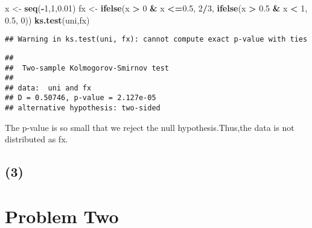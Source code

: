 \documentclass[]{article}
\newenvironment{Shaded}{\begin{snugshade}}{\end{snugshade}}
\newcommand{\KeywordTok}[1]{\textcolor[rgb]{0.13,0.29,0.53}{\textbf{#1}}}
\newcommand{\DecValTok}[1]{\textcolor[rgb]{0.00,0.00,0.81}{#1}}
\newcommand{\FloatTok}[1]{\textcolor[rgb]{0.00,0.00,0.81}{#1}}
\newcommand{\StringTok}[1]{\textcolor[rgb]{0.31,0.60,0.02}{#1}}
\newcommand{\OperatorTok}[1]{\textcolor[rgb]{0.81,0.36,0.00}{\textbf{#1}}}
\newcommand{\NormalTok}[1]{#1}
\begin{document}
\begin{Shaded}
\begin{Highlighting}[]
\NormalTok{x <-}\StringTok{ }\KeywordTok{seq}\NormalTok{(}\OperatorTok{-}\DecValTok{1}\NormalTok{,}\DecValTok{1}\NormalTok{,}\FloatTok{0.01}\NormalTok{)}
\NormalTok{fx <-}\StringTok{ }\KeywordTok{ifelse}\NormalTok{(x }\OperatorTok{>}\StringTok{ }\DecValTok{0} \OperatorTok{&}\StringTok{ }\NormalTok{x }\OperatorTok{<=}\FloatTok{0.5}\NormalTok{, }\DecValTok{2}\OperatorTok{/}\DecValTok{3}\NormalTok{,}
   \KeywordTok{ifelse}\NormalTok{(x }\OperatorTok{>}\StringTok{ }\FloatTok{0.5} \OperatorTok{&}\StringTok{ }\NormalTok{x }\OperatorTok{<}\StringTok{ }\DecValTok{1}\NormalTok{,  }\FloatTok{0.5}\NormalTok{, }\DecValTok{0}\NormalTok{))}
\KeywordTok{ks.test}\NormalTok{(uni,fx)}
\end{Highlighting}
\end{Shaded}

\begin{verbatim}
## Warning in ks.test(uni, fx): cannot compute exact p-value with ties
\end{verbatim}

\begin{verbatim}
## 
##  Two-sample Kolmogorov-Smirnov test
## 
## data:  uni and fx
## D = 0.50746, p-value = 2.127e-05
## alternative hypothesis: two-sided
\end{verbatim}

The p-value is so small that we reject the null hypothesis.Thus,the data
is not distributed as fx.

\subsection{(3)}\label{section-2}

\section{Problem Two}\label{problem-two}
\end{document}
